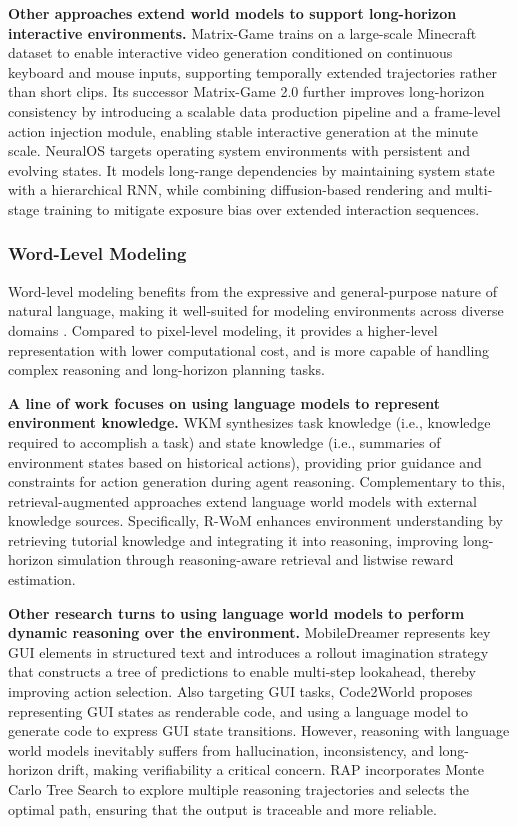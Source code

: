 \documentclass{llmxive}
\begin{document}
\textbf{Other approaches extend world models to support long-horizon interactive environments.} 
Matrix-Game \cite{Matrix-Game} trains on a large-scale Minecraft dataset to enable interactive video generation conditioned on continuous keyboard and mouse inputs, supporting temporally extended trajectories rather than short clips. Its successor Matrix-Game 2.0 \cite{Matrix-Game_2.0} further improves long-horizon consistency by introducing a scalable data production pipeline and a frame-level action injection module, enabling stable interactive generation at the minute scale. 
NeuralOS \cite{NeuralOS} targets operating system environments with persistent and evolving states. It models long-range dependencies by maintaining system state with a hierarchical RNN, while combining diffusion-based rendering and multi-stage training to mitigate exposure bias over extended interaction sequences.


\subsubsection{Word-Level Modeling}
\label{sec:Word-level Modeling}

Word-level modeling benefits from the expressive and general-purpose nature of natural language, making it well-suited for modeling environments across diverse domains \cite{GTM, CWM, ITP}. Compared to pixel-level modeling, it provides a higher-level representation with lower computational cost, and is more capable of handling complex reasoning and long-horizon planning tasks.

\textbf{A line of work focuses on using language models to represent environment knowledge.} WKM \cite{WKM} synthesizes task knowledge (i.e., knowledge required to accomplish a task) and state knowledge (i.e., summaries of environment states based on historical actions), providing prior guidance and constraints for action generation during agent reasoning. Complementary to this, retrieval-augmented approaches extend language world models with external knowledge sources. Specifically, R-WoM \cite{R-WoM} enhances environment understanding by retrieving tutorial knowledge and integrating it into reasoning, improving long-horizon simulation through reasoning-aware retrieval and listwise reward estimation. 

\textbf{Other research turns to using language world models to perform dynamic reasoning over the environment.} MobileDreamer \cite{MobileDreamer} represents key GUI elements in structured text and introduces a rollout imagination strategy that constructs a tree of predictions to enable multi-step lookahead, thereby improving action selection. Also targeting GUI tasks, Code2World \cite{Code2World} proposes representing GUI states as renderable code, and using a language model to generate code to express GUI state transitions. However, reasoning with language world models inevitably suffers from hallucination, inconsistency, and long-horizon drift, making verifiability a critical concern. RAP \cite{RAP} incorporates Monte Carlo Tree Search to explore multiple reasoning trajectories and selects the optimal path, ensuring that the output is traceable and more reliable.
\end{document}
